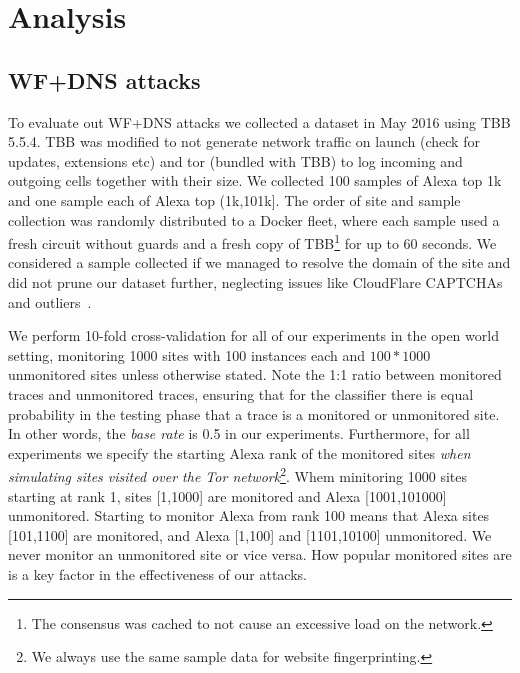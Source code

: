\section{Analysis}
\label{sec:analysis}

\subsection{WF+DNS attacks}
To evaluate out WF+DNS attacks we collected a dataset in May 2016 using TBB
5.5.4.
TBB was modified to not generate network traffic on launch (check for
updates, extensions etc) and
tor (bundled with TBB) to log incoming and outgoing cells together with
their size. We collected 100 samples of Alexa top 1k and one sample each of
Alexa top (1k,101k]. The order of site and sample collection was randomly
distributed to a Docker fleet, where each sample used a fresh circuit without
guards and a fresh copy of TBB\footnote{The consensus was cached to not
cause an excessive load on the network.} for up to 60 seconds. We considered
a sample collected if we managed to resolve the domain of the site
and did not prune our dataset further, neglecting issues like CloudFlare
CAPTCHAs and outliers~\cite{Juarez2014a}.

We perform 10-fold cross-validation for all of our experiments in the open
world setting, monitoring 1000 sites with 100 instances each and
$100*1000$ unmonitored sites unless otherwise stated.
Note the 1:1 ratio between monitored traces and unmonitored traces,
ensuring that for the classifier there is equal probability in the testing
phase that a trace is a monitored or unmonitored site.
In other words, the \emph{base rate} is 0.5 in our experiments.
Furthermore, for all experiments we specify the starting Alexa rank of the
monitored sites
\emph{when simulating sites visited over the Tor network}\footnote{We always
use the same sample data for website fingerprinting.}.
Whem minitoring 1000 sites starting at rank 1, sites
[1,1000] are monitored and Alexa [1001,101000] unmonitored. Starting to
monitor Alexa from rank 100 means that Alexa sites [101,1100] are monitored,
and Alexa [1,100] and [1101,10100] unmonitored.
We never monitor an unmonitored site or vice versa.
How popular monitored sites
are is a key factor in the effectiveness of our attacks.


